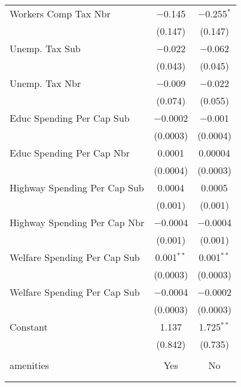 \begin{table}[!htbp]
\begin{tabular}{@{\extracolsep{5pt}}lcc}
  Workers Comp Tax Nbr & $-$0.145 & $-$0.255$^{*}$ \\ 
  & (0.147) & (0.147) \\ 
  Unemp. Tax Sub & $-$0.022 & $-$0.062 \\ 
  & (0.043) & (0.045) \\ 
  Unemp. Tax Nbr & $-$0.009 & $-$0.022 \\ 
  & (0.074) & (0.055) \\ 
  Educ Spending Per Cap Sub & $-$0.0002 & $-$0.001 \\ 
  & (0.0003) & (0.0004) \\ 
  Educ Spending Per Cap Nbr & 0.0001 & 0.00004 \\ 
  & (0.0004) & (0.0003) \\ 
  Highway Spending Per Cap Sub & 0.0004 & 0.0005 \\ 
  & (0.001) & (0.001) \\ 
  Highway Spending Per Cap Nbr & $-$0.0004 & $-$0.0004 \\ 
  & (0.001) & (0.001) \\ 
  Welfare Spending Per Cap Sub & 0.001$^{**}$ & 0.001$^{**}$ \\ 
  & (0.0003) & (0.0003) \\ 
  Welfare Spending Per Cap Sub & $-$0.0004 & $-$0.0002 \\ 
  & (0.0003) & (0.0003) \\ 
  Constant & 1.137 & 1.725$^{**}$ \\ 
  & (0.842) & (0.735) \\ 
 \hline \\[-1.8ex] 
amenities & Yes & No \\ 
\hline \\[-1.8ex] 
\hline 
\hline \\[-1.8ex] 
\end{tabular} 
\end{table} 
